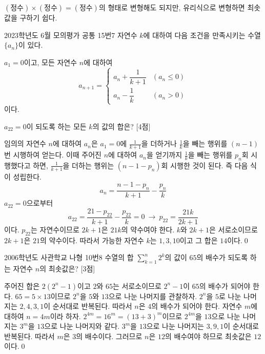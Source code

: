 \documentclass{article}
\begin{document}
\begin{remark}[참고]
	$(\text{정수})\times(\text{정수})=(\text{정수})$의 형태로 변형해도 되지만, 유리식으로 변형하면 최솟값을 구하기 쉽다.
\end{remark}

\newpage
\begin{prob}{2023학년도 6월 모의평가 공통 15번}{7}
	자연수 $k$에 대하여 다음 조건을 만족시키는 수열 $\{a_n\}$이 있다.
	\begin{hint}
		$a_1=0$이고, 모든 자연수 $n$에 대하여
		\[
			a_{n+1}=\begin{cases}
				a_n+\dfrac{1}{k+1} & (a_n\leq0) \\[9pt]
				a_n-\dfrac{1}{k} & (a_n>0)
			\end{cases}
		\]
		이다.
	\end{hint}
	$a_{22}=0$이 되도록 하는 모든 $k$의 값의 합은? [4점]
\end{prob}

\begin{sol}
	임의의 자연수 $n$에 대하여 $a_n$은 $a_1=0$에 $\frac{1}{k+1}$을 더하거나 $\frac{1}{k}$을 빼는 행위를 $(n-1)$번 시행하여 얻는다. 이때 주어진 $n$에 대하여 $a_n$을 얻기까지 $\frac{1}{k}$을 빼는 행위를 $p_n$회 시행했다고 하면, $\frac{1}{k+1}$을 더하는 행위는 $(n-1-p_n)$회 시행한 것이 된다. 즉 다음 식이 성립한다.
	\[
		a_n=\frac{n-1-p_n}{k+1}-\frac{p_n}{k}
	\]
	$a_{22}=0$으로부터
	\[
		a_{22}=\frac{21-p_{22}}{k+1}-\frac{p_{22}}{k}=0~\longrightarrow~p_{22}=\frac{21k}{2k+1}
	\]
	이다. $p_{22}$는 자연수이므로 $2k+1$은 $21k$의 약수여야 한다. $k$와 $2k+1$은 서로소이므로 $2k+1$은 $21$의 약수이다. 따라서 가능한 자연수 $k$는 $1,3,10$이고 그 합은 $14$이다.\qed
\end{sol}

\newpage
\begin{prob}{2006학년도 사관학교 나형 10번}{8}
	수열의 합 $\displaystyle\sum_{k=1}^n2^k$의 값이 $65$의 배수가 되도록 하는 자연수 $n$의 최솟값은? [3점]
\end{prob}

\begin{sol}
	주어진 합은 $2(2^n-1)$이고 $2$와 $65$는 서로소이므로 $2^n-1$이 $65$의 배수가 되어야 한다. $65=5\times 13$이므로 $2^n$을 $5$와 $13$으로 나눈 나머지를 관찰하자. $2^n$을 $5$로 나눈 나머지는 $2,4,3,1$이 순서대로 반복된다. 따라서 $n$은 $4$의 배수가 되어야 한다. 자연수 $m$에 대하여 $n=4m$이라 하자. $2^{4m}=16^m=(13+3)^m$이므로 $2^{4m}$을 $13$으로 나눈 나머지는 $3^m$을 $13$으로 나눈 나머지와 같다. $3^m$을 $13$으로 나눈 나머지는 $3,9,1$이 순서대로 반복된다. 따라서 $m$은 $3$의 배수이다. 그러므로 $n$은 $12$의 배수여야 하므로 최솟값은 $12$이다.\qed
\end{sol}
\end{document}
